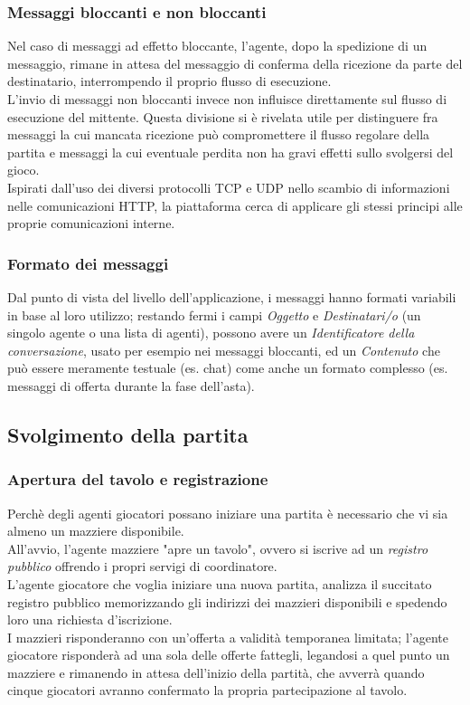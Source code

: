 \documentclass[runningheads,a4paper]{llncs}
\begin{document}
\subsubsection{Messaggi bloccanti e non bloccanti}
Nel caso di messaggi ad effetto bloccante, l'agente, dopo la spedizione di un messaggio, rimane in attesa del messaggio di conferma della ricezione da parte del destinatario, interrompendo il proprio flusso di esecuzione.\\
L'invio di messaggi non bloccanti invece non influisce direttamente sul flusso di esecuzione del mittente.
Questa divisione si è rivelata utile per distinguere fra messaggi la cui mancata ricezione può compromettere il flusso regolare della partita e messaggi la cui eventuale perdita non ha gravi effetti sullo svolgersi del gioco.\\
Ispirati dall'uso dei diversi protocolli TCP e UDP nello scambio di informazioni nelle comunicazioni HTTP, la piattaforma cerca di applicare gli stessi principi alle proprie comunicazioni interne.\\
\subsubsection{Formato dei messaggi}
Dal punto di vista del livello dell'applicazione, i messaggi hanno formati variabili in base al loro utilizzo; restando fermi i campi \emph{Oggetto} e \emph{Destinatari/o} (un singolo agente o una lista di agenti), possono avere un \emph{Identificatore della conversazione}, usato per esempio nei messaggi bloccanti, ed un \emph{Contenuto} che può essere meramente testuale (es. chat) come anche un formato complesso (es. messaggi di offerta durante la fase dell'asta).


\subsection{Svolgimento della partita}
\subsubsection{Apertura del tavolo e registrazione}
Perchè degli agenti giocatori possano iniziare una partita è necessario che vi sia almeno un mazziere disponibile.\\
All'avvio, l'agente mazziere "apre un tavolo", ovvero si iscrive ad un \emph{registro pubblico} offrendo i propri servigi di coordinatore.\\
L'agente giocatore che voglia iniziare una nuova partita, analizza il succitato registro pubblico memorizzando gli indirizzi dei mazzieri disponibili e spedendo loro una richiesta d'iscrizione.\\
I mazzieri risponderanno con un'offerta a validità temporanea limitata; l'agente giocatore risponderà ad una sola delle offerte fattegli, legandosi a quel punto un mazziere e rimanendo in attesa dell'inizio della partità, che avverrà quando cinque giocatori avranno confermato la propria partecipazione al tavolo.\\
\end{document}

